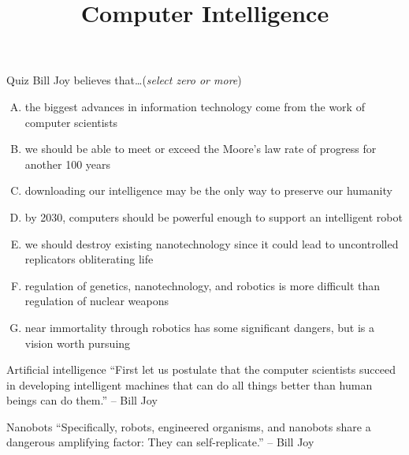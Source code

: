 \documentclass{beamer}
\title{Computer Intelligence}
\date{}
\begin{document}
\begin{frame}
\titlepage
\end{frame}

\begin{frame}{Quiz}
Bill Joy believes that\ldots \hfill (\emph{select zero or more})
\begin{enumerate}[(A)]
\item<1> the biggest advances in information technology come from the work of computer scientists %
\item<1> we should be able to meet or exceed the Moore's law rate of progress for another 100 years %
\item<1> downloading our intelligence may be the only way to preserve our humanity %
\item<1-2> by 2030, computers should be powerful enough to support an intelligent robot
\item<1> we should destroy existing nanotechnology since it could lead to uncontrolled replicators obliterating life %
\item<1-2> regulation of genetics, nanotechnology, and robotics is more difficult than regulation of nuclear weapons %
\item<1> near immortality through robotics has some significant dangers, but is a vision worth pursuing
\end{enumerate}
\end{frame}

\begin{frame}{Artificial intelligence}
``First let us postulate that the computer scientists succeed in developing intelligent machines that can do all things better than human beings can do them.'' -- Bill Joy \\
\bigskip
\href{http://www.npr.org/player/v2/mediaPlayer.html?action=1&t=1&islist=false&id=155792609&m=155798855}{}
\end{frame}

\begin{frame}{Nanobots}
``Specifically, robots, engineered organisms, and nanobots share a dangerous amplifying factor: They can self-replicate.'' -- Bill Joy \\
\bigskip
\href{https://www.youtube.com/watch?v=K_EWzxRn8Xo}{}
\end{frame}
\end{document}
